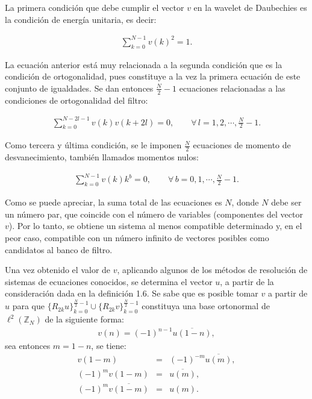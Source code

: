 \par La primera condici\'on que debe cumplir el vector $v$ en la wavelet de Daubechies es la condici\'on de energ\'ia unitaria, es decir:

\begin{eqnarray}
\sum_{k=0}^{N-1}v(k)^2=1.
\label{energiaunitaria}
\end{eqnarray}

\par La ecuaci\'on anterior est\'a muy relacionada a la segunda condici\'on que es la condici\'on de ortogonalidad, pues constituye a la vez la primera ecuaci\'on de este conjunto de igualdades. Se dan entonces $\frac{N}{2}-1$ ecuaciones relacionadas a las condiciones de ortogonalidad del filtro:

\begin{eqnarray}
\sum_{k=0}^{N-2l-1}v(k)v(k+2l)=0,\qquad\forall\,l=1,2,\cdots,\frac{N}{2}-1.
\label{ortogonalidad}
\end{eqnarray}

\par Como tercera y \'ultima condici\'on, se le imponen $\frac{N}{2}$ ecuaciones de momento de desvanecimiento, tambi\'en llamados momentos nulos:

\begin{eqnarray}
\sum_{k=0}^{N-1}v(k)k^b=0,\qquad\forall\,b=0,1,\cdots,\frac{N}{2}-1.
\label{momento-nulo}
\end{eqnarray}

\par Como se puede apreciar, la suma total de las ecuaciones es $N$, donde $N$ debe ser un n\'umero par, que coincide con el n\'umero de variables (componentes del vector $v$). Por lo tanto, se obtiene un sistema al menos compatible determinado y, en el peor caso, compatible con un n\'umero infinito de vectores posibles como candidatos al banco de filtro.

\par Una vez obtenido el valor de $v$, aplicando algunos de los m\'etodos de resoluci\'on de sistemas de ecuaciones conocidos, se determina el vector $u$, a partir de la consideraci\'on dada en la definici\'on 1.6. Se sabe que es posible tomar $v$ a partir de $u$ para que $\{R_{2k}u\}_{k=0}^{\frac{N}{2}-1} \cup \{R_{2k}v\}_{k=0}^{\frac{N}{2}-1}$ constituya una base ortonormal de $\ell^2(\mathbb{Z}_N)$ de la siguiente forma:
\begin{eqnarray}
v(n)=(-1)^{n-1}\overline{u(1-n)},\nonumber
\end{eqnarray}
sea entonces $m=1-n$, se tiene:
\begin{eqnarray}
v(1-m)&=&(-1)^{-m}\overline{u(m)},\nonumber\\
(-1)^{m}v(1-m)&=&\overline{u(m)},\nonumber\\
(-1)^{m}\overline{v(1-m)}&=&u(m).\nonumber
\end{eqnarray}

